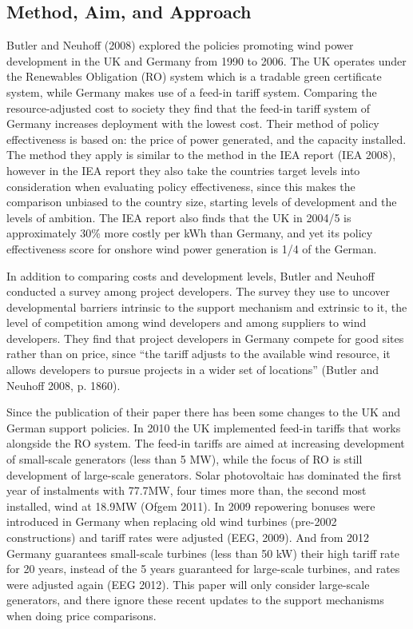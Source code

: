 \documentclass[a4paper, 12pt]{article}
\begin{document}
\subsection{Method, Aim, and Approach}
Butler and Neuhoff (2008) explored the policies promoting wind power development in the UK and Germany from 1990 to 2006. The UK operates under the Renewables Obligation (RO) system which is a tradable green certificate system, while Germany makes use of a feed-in tariff system. Comparing the resource-adjusted cost to society they find that the feed-in tariff system of Germany increases deployment with the lowest cost. Their method of policy effectiveness is based on: the price of power generated, and the capacity installed. The method they apply is similar to the method in the IEA report (IEA 2008), however in the IEA report they also take the countries target levels into consideration when evaluating policy effectiveness, since this makes the comparison unbiased to the country size, starting levels of development and the levels of ambition. The IEA report also finds that the UK in 2004/5 is approximately 30\% more costly per kWh than Germany, and yet its policy effectiveness score for onshore wind power generation is 1/4 of the German.

In addition to comparing costs and development levels, Butler and Neuhoff conducted a survey among project developers. The survey they use to uncover developmental barriers intrinsic to the support mechanism and extrinsic to it, the level of competition among wind developers and among suppliers to wind developers. They find that project developers in Germany compete for good sites rather than on price, since ``the tariff adjusts to the available wind resource, it allows developers to pursue projects in a wider set of locations'' (Butler and Neuhoff 2008, p. 1860).

Since the publication of their paper there has been some changes to the UK and German support policies. In 2010 the UK implemented feed-in tariffs that works alongside the RO system. The feed-in tariffs are aimed at increasing development of small-scale generators (less than 5 MW), while the focus of RO is still development of large-scale generators. Solar photovoltaic has dominated the first year of instalments with 77.7MW, four times more than, the second most installed, wind at 18.9MW (Ofgem 2011). In 2009 repowering bonuses were introduced in Germany when replacing old wind turbines (pre-2002 constructions) and tariff rates were adjusted (EEG, 2009). And from 2012 Germany guarantees small-scale turbines (less than 50 kW) their high tariff rate for 20 years, instead of the 5 years guaranteed for large-scale turbines, and rates were adjusted again (EEG 2012). This paper will only consider large-scale generators, and there ignore these recent updates to the support mechanisms when doing price comparisons.
\end{document}
